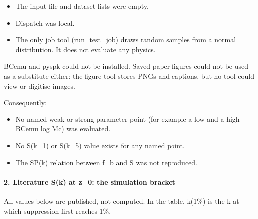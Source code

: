 \documentclass[11pt,a4paper]{article}
\begin{document}
\begin{itemize}
  \item The input-file and dataset lists were empty.
  \item Dispatch was local.
  \item The only job tool (run\_test\_job) draws random samples from a normal distribution. It does not evaluate any physics.
\end{itemize}
BCemu and pyspk could not be installed. Saved paper figures could not be used as a substitute either: the figure tool stores PNGs and captions, but no tool could view or digitise images.

Consequently:

\begin{itemize}
  \item No named weak or strong parameter point (for example a low and a high BCemu log Mc) was evaluated.
  \item No S(k=1) or S(k=5) value exists for any named point.
  \item The SP(k) relation between f\_b and S was not reproduced.
\end{itemize}
\paragraph{2. Literature S(k) at z=0: the simulation bracket}
All values below are published, not computed. In the table, k(1\%) is the k at which suppression first reaches 1\%.
\end{document}
